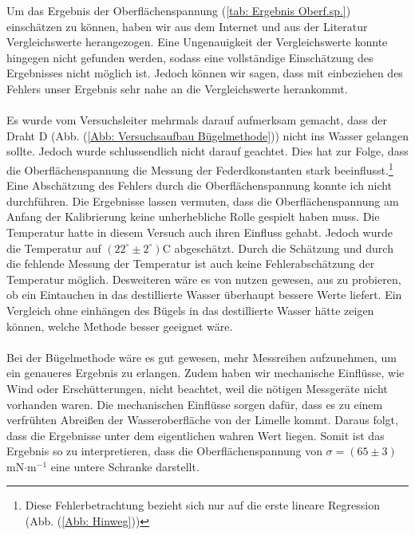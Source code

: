 \documentclass[bibliography=totocnumbered]{scrartcl}
\begin{document}
	Um das Ergebnis der Oberflächenspannung (\ref{tab: Ergebnis Oberf.sp.}) einschätzen zu können, haben wir aus dem Internet\smartcite{Unbekannt.09.07.2021} und aus der Literatur\smartcite[vgl.][88]{Eichler.2016} Vergleichswerte herangezogen. Eine Ungenauigkeit der Vergleichswerte konnte hingegen nicht gefunden werden, sodass eine vollständige Einschätzung des Ergebnisses nicht möglich ist. Jedoch können wir sagen, dass mit einbeziehen des Fehlers unser Ergebnis sehr nahe an die Vergleichswerte herankommt.  \\\\
	Es wurde vom Versuchsleiter mehrmals darauf aufmerksam gemacht, dass der Draht D (Abb. (\ref{Abb: Versuchsaufbau Bügelmethode})) nicht ins Wasser gelangen sollte. Jedoch wurde schlussendlich nicht darauf geachtet. Dies hat zur Folge, dass die Oberflächenspannung die Messung der Federdkonstanten stark beeinflusst.\footnote{Diese Fehlerbetrachtung bezieht sich nur auf die erste lineare Regression (Abb. (\ref{Abb: Hinweg}))} Eine Abschätzung des Fehlers durch die Oberflächenspannung konnte ich nicht durchführen. Die Ergebnisse lassen vermuten, dass die Oberflächenspannung am Anfang der Kalibrierung keine unherhebliche Rolle gespielt haben muss. Die Temperatur hatte in diesem Versuch auch ihren Einfluss gehabt. Jedoch wurde die Temperatur auf  $ (22^{\circ}\pm 2^{\circ}) $C abgeschätzt. Durch die Schätzung und durch die fehlende Messung der Temperatur ist auch keine Fehlerabschätzung der Temperatur möglich. Desweiteren wäre es von nutzen gewesen, aus zu probieren, ob ein Eintauchen in das destillierte Wasser überhaupt bessere Werte liefert. Ein Vergleich ohne einhängen des Bügels in das destillierte Wasser hätte zeigen können, welche Methode besser geeignet wäre. \\
	\\
	
	Bei der Bügelmethode wäre es gut gewesen, mehr Messreihen aufzunehmen, um ein genaueres Ergebnis zu erlangen. Zudem haben wir mechanische Einflüsse, wie Wind oder Erschütterungen, nicht beachtet, weil die nötigen Messgeräte nicht vorhanden waren. Die mechanischen Einflüsse sorgen dafür, dass es zu einem verfrühten Abreißen der Wasseroberfläche von der Limelle kommt. Daraus folgt, dass die Ergebnisse unter dem eigentlichen wahren Wert liegen. Somit ist das Ergebnis so zu interpretieren, dass die Oberflächenspannung von $ \sigma=(65\pm 3) $mN$ \cdot $m$ ^{-1} $ eine untere Schranke darstellt.
	
	
	
	\newpage
    \appendix
	
\newpage
	\printbibliography[title={Quellenverzeichnis}]
	
	
\end{document}
